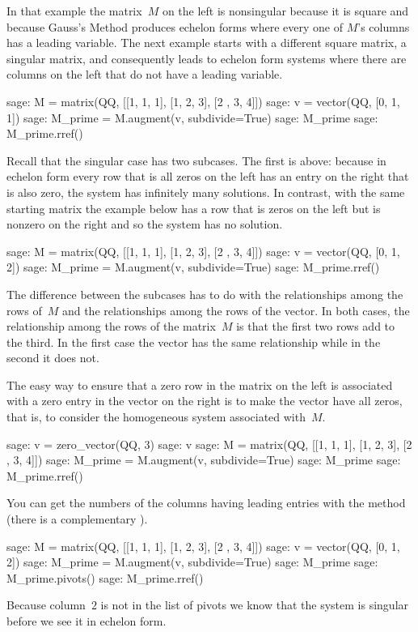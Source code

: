 In that example the matrix~$M$ on the left is nonsingular because it is 
square and because Gauss's Method produces echelon forms where every one of
$M$'s columns has a leading variable.
The next example starts with a different square matrix, a 
singular matrix, and consequently leads to 
echelon form systems where there are columns on the left 
that do not have a leading variable. 
\begin{sagecommandline}
sage: M = matrix(QQ, [[1, 1, 1], [1, 2, 3], [2 , 3, 4]])    
sage: v = vector(QQ, [0, 1, 1]) 
sage: M_prime = M.augment(v, subdivide=True)
sage: M_prime
sage: M_prime.rref()
\end{sagecommandline}
\noindent
Recall that the singular case has two subcases.
The first is above: because in echelon form
every row that is all zeros on the
left has an entry on the right that is also zero,
the system has infinitely many solutions.
In contrast, with the same starting matrix
the example below has a row that is zeros on the left but is nonzero
on the right and so the system has no solution.
\begin{sagecommandline}
sage: M = matrix(QQ, [[1, 1, 1], [1, 2, 3], [2 , 3, 4]])    
sage: v = vector(QQ, [0, 1, 2])             
sage: M_prime = M.augment(v, subdivide=True)
sage: M_prime.rref()                        
\end{sagecommandline}
\noindent
The difference between the subcases
has to do with the relationships among  
the rows of~$M$ and the relationships among the rows of the vector.
In both cases, the relationship among the rows of the matrix~$M$
is that the first two rows add to the third.
In the first case the vector has the same relationship while in the second
it does not.

The easy way to ensure that a zero row in the matrix 
on the left is associated with a zero
entry in the vector on the right is to make the vector have all zeros, that is,
to consider the homogeneous system associated with~$M$.
\begin{sagecommandline}
sage: v = zero_vector(QQ, 3)
sage: v
sage: M = matrix(QQ, [[1, 1, 1], [1, 2, 3], [2 , 3, 4]]) 
sage: M_prime = M.augment(v, subdivide=True)
sage: M_prime
sage: M_prime.rref()
\end{sagecommandline}

You can get the numbers of the columns having leading entries with 
the  method
(there is a complementary ).
\begin{sagecommandline}
sage: M = matrix(QQ, [[1, 1, 1], [1, 2, 3], [2 , 3, 4]]) 
sage: v = vector(QQ, [0, 1, 2])
sage: M_prime = M.augment(v, subdivide=True)
sage: M_prime                  
sage: M_prime.pivots()         
sage: M_prime.rref()
\end{sagecommandline}
\noindent
Because column~$2$ is not in the list of pivots we know that the
system is singular before we see it in echelon form.

